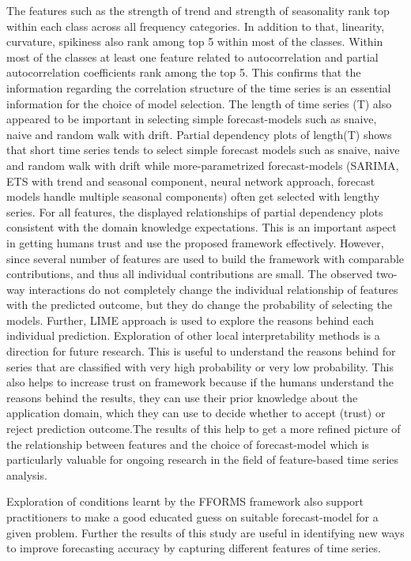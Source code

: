 \documentclass[11pt,a4paper,]{article}
\begin{document}
The features such as the strength of trend and strength of seasonality rank top within each class across all frequency categories. In addition to that, linearity, curvature, spikiness also rank among top 5 within most of the classes. Within most of the classes at least one feature related to autocorrelation and partial autocorrelation coefficients rank among the top 5. This confirms that the information regarding the correlation structure of the time series is an essential information for the choice of model selection. The length of time series (T) also appeared to be important in selecting simple forecast-models such as snaive, naive and random walk with drift. Partial dependency plots of length(T) shows that short time series tends to select simple forecast models such as snaive, naive and random walk with drift while more-parametrized forecast-models (SARIMA, ETS with trend and seasonal component, neural network approach, forecast models handle multiple seasonal components) often get selected with lengthy series. For all features, the displayed relationships of partial dependency plots consistent with the domain knowledge expectations. This is an important aspect in getting humans trust and use the proposed framework effectively. However, since several number of features are used to build the framework with comparable contributions, and thus all individual contributions are small. The observed two-way interactions do not completely change the individual relationship of features with the predicted outcome, but they do change the probability of selecting the models. Further, LIME approach is used to explore the reasons behind each individual prediction. Exploration of other local interpretability methods is a direction for future research. This is useful to understand the reasons behind for series that are classified with very high probability or very low probability. This also helps to increase trust on framework because if the humans understand the reasons behind the results, they can use their prior knowledge about the application domain, which they can use to decide whether to accept (trust) or reject prediction outcome.The results of this help to get a more refined picture of the relationship between features and the choice of forecast-model which is particularly valuable for ongoing research in the field of feature-based time series analysis.

Exploration of conditions learnt by the FFORMS framework also support practitioners to make a good educated guess on suitable forecast-model for a given problem. Further the results of this study are useful in identifying new ways to improve forecasting accuracy by capturing different features of time series.
\end{document}
